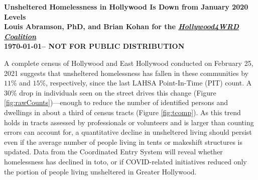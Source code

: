 \documentclass[11pt]{article}
\def\bfr{\bf\color{red}}
\def\resp{respectively}
\begin{document}

\begin{center}
	\Large\bf Unsheltered Homelessness in Hollywood Is Down from January 2020 Levels\\
	\vspace{1ex}
	{\normalsize\rm Louis Abramson, PhD, and Brian Kohan 
	for the \href{http://www.hollywood4wrd.live}{\it Hollywood4WRD Coalition} \\ \today -- {\bfr NOT FOR PUBLIC DISTRIBUTION}}


\end{center}

 A complete census of Hollywood and East Hollywood conducted on February 25, 2021 
suggests that unsheltered homelessness has fallen in these communities by $11\%$ and $15\%$, \resp, since the 
last LAHSA Point-In-Time (PIT) count. A 30\% drop in individuals seen on the street drives this 
change (Figure \ref{fig:rawCounts})---enough to reduce the number of identified persons and dwellings in 
about a third of census tracts (Figure \ref{fig:tcomp}). As this trend holds in tracts assessed by professionals or 
volunteers and is larger than counting errors can account for, a quantitative decline in unsheltered 
living should persist even if the average number of people living in tents or makeshift structures is updated. Data 
from the Coordinated Entry System will reveal whether homelessness has declined in toto, or if COVID-related initiatives 
reduced only the portion of people living unsheltered in Greater Hollywood.
\end{document}
